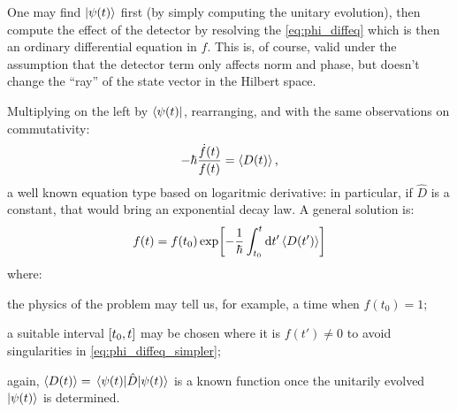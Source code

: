 One may find $\ket{\psi(t)}$ first (by simply computing the unitary evolution),
then compute the effect of the detector by resolving the \eqref{eq:phi_diffeq}
which is then an ordinary differential equation in $f$. This is, of course, valid
under the assumption that the detector term only affects norm and phase,
but doesn't change the ``ray'' of the state vector in the Hilbert space. 

Multiplying on the left by $\bra{\psi(t)}$, rearranging, and with the same observations
on commutativity:
\begin{equation}\label{eq:phi_diffeq_simpler}
  -\hbar\frac{\dot{f}(t)}{f(t)} = \ev{D(t)} \text{,}
\end{equation}
a well known equation type based on logaritmic derivative: in particular,
if $\hat{D}$ is a constant, that would bring an exponential decay law.
A general solution is:
\begin{equation}
  f(t) = f(t_0) \exp[ -\frac{1}{\hbar} \int_{t_0}^{t} \dd{t'} \ev{D(t')} ]
\end{equation}
where:
\begin{enumerate*}[label=\emph{\alph*})]
  \item
    the physics of the problem may tell us, for example, a time when $f(t_0) = 1$;
  \item
    a suitable interval $\qty[t_0, t]$ may be chosen where it is $f(t') \ne 0$
    to avoid singularities in \eqref{eq:phi_diffeq_simpler};
  \item
    again, $\ev{D(t)} = \mel{\psi(t)}{\hat{D}}{\psi(t)}$ is a known function
    once the unitarily evolved $\ket{\psi(t)}$ is determined.
\end{enumerate*}


   